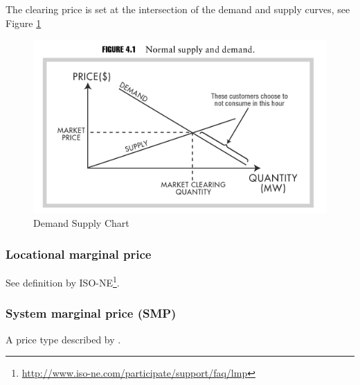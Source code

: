 %
%
%

The clearing price is set at the intersection of the demand and supply curves, see Figure \ref{fig:market_demand_supply}



\begin{figure}[!h]
	\centering
		\includegraphics{figures/methodology/market_demand_supply.PNG}
	\caption{Demand Supply Chart}
	\label{fig:market_demand_supply}
\end{figure}



\subsubsection{Locational marginal price}

See definition by ISO-NE\footnote{\url{http://www.iso-ne.com/participate/support/faq/lmp}}. 


\subsubsection{System marginal price (SMP)}

A price type described by \cite{szkuta1999electricity}. 

